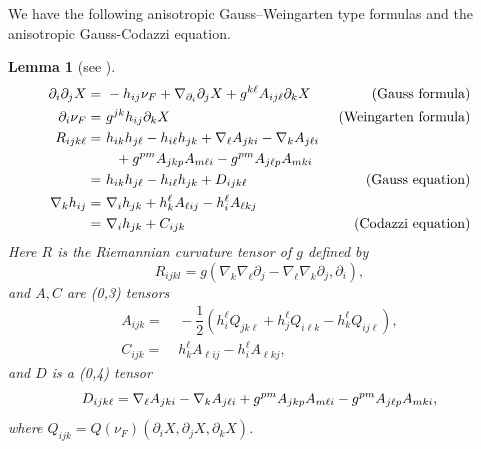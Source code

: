 \documentclass[11pt,reqno]{amsart}
\newtheorem{lemma}[proposition]{Lemma}
\theoremstyle{definition}
\theoremstyle{remark}
\numberwithin{equation}{section}
\begin{document}
	We have the following anisotropic Gauss--Weingarten type formulas and the anisotropic Gauss-Codazzi equation.
	\begin{lemma}[see {\cite[Lemma 6.7]{Xia12}}]
		\label{lem-formula}
		\begin{align}
			\partial_i\partial_j X = & ~- h_{ij}\nu_F + \nabla_{\partial_i} \partial_j X+ g^{k\ell} A_{ij\ell}\partial_k X \quad &\text{(Gauss formula)} \label{gaussformula}\\
			\partial_i \nu_F = & ~g^{jk}h_{ij}\partial_k X \quad &\text{(Weingarten formula)}   \label{weinformula}\\
			R_{ijk\ell} =&~ h_{ik}h_{j\ell} - h_{i\ell}h_{jk} + \nabla_{\ell}A_{jki}-\nabla_{k}A_{j\ell i}\notag  \\
			&\quad  + g^{pm}A_{jkp}A_{m\ell i} - g^{pm}A_{j\ell p}A_{mki} \notag \\
			=& ~h_{ik}h_{j\ell} - h_{i\ell}h_{jk} + D_{ijk\ell} \quad &\text{(Gauss equation)}  \notag\\
			\nabla_k h_{ij} =& ~\nabla_{i} h_{jk}  + h_k^{\ell} A_{\ell i j} -h_{i}^{\ell} A_{\ell k j} \notag \\
			=&~ \nabla_{i} h_{jk} + C_{ijk} \quad &\text{(Codazzi equation)}  \label{codazziequ}
		\end{align}
		Here $R$ is the Riemannian curvature tensor of $g$ defined by
		\begin{equation*}
			R_{ijkl} =g\left( \nabla_{k}\nabla_{\ell} \partial_j - \nabla_{\ell}\nabla_{k} \partial_j, \partial_i \right),
		\end{equation*}
		and $A , C$   are (0,3) tensors
		\begin{align}
			A_{ijk} = &~-\dfrac{1}{2}\left( h^{\ell}_i Q_{jk\ell} + h^{\ell}_j Q_{i\ell k} - h^{\ell}_k Q_{ij\ell} \right),  \label{Atensor} \\
			C_{ijk}= &~h_k^{\ell} A_{\ell i j} -h_{i}^{\ell} A_{\ell k j},\nonumber
		\end{align}
		and $D$ is a (0,4) tensor
		\begin{equation*}
			D_{ijk\ell}= \nabla_{\ell}A_{jki}-\nabla_{k}A_{j\ell i}\notag
			+ g^{pm}A_{jkp}A_{m\ell i} - g^{pm}A_{j\ell p}A_{mki},
		\end{equation*}
		where $Q_{ijk}=Q(\nu_F)(\partial_i X, \partial_j X, \partial_k X)$.
	\end{lemma}
\end{document}
